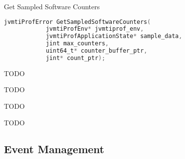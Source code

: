 \begin{apidef}{Get Sampled Software Counters}
\begin{lstlisting}[language=C]
jvmtiProfError GetSampledSoftwareCounters(
            jvmtiProfEnv* jvmtiprof_env,
            jvmtiProfApplicationState* sample_data,
            jint max_counters,
            uint64_t* counter_buffer_ptr,
            jint* count_ptr);
\end{lstlisting}

\begin{apidesc}
TODO
\end{apidesc}

\begin{apiphase}
TODO
\end{apiphase}

\begin{apicap}
TODO
\end{apicap}

\begin{apiparam}
\end{apiparam}

\begin{apireturn}
TODO
\end{apireturn}

\begin{apierror}
\end{apierror}
\end{apidef}

\subsection{Event Management} \label{sec:eventmgr}

